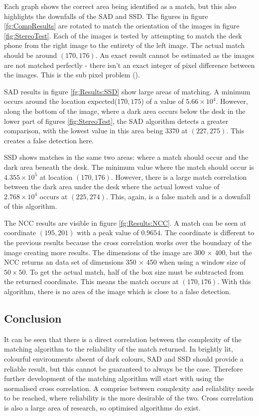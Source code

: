 Each graph shows the correct area being identified as a match, but this also highlights the downfalls of the SAD and SSD. The figures in figure \ref{fg:CompResults} are rotated to match the orientation of the images in figure \ref{fig:StereoTest}. Each of the images is tested by attempting to match the desk phone from the right image to the entirety of the left image. The actual match should be around $(170, 176)$. An exact result cannot be estimated as the images are not matched perfectly - there isn't an exact integer of pixel difference between the images. This is the sub pixel problem (\cite{haller2012design}).

SAD results in figure \ref{fg:Results:SSD} show large areas of matching. A minimum occurs around the location expected($170,175$) of a value of $5.66\times 10^4$. However, along the bottom of the image, where a dark area occurs below the desk in the lower part of figures \ref{fig:StereoTest}, the SAD algorithm detects a greater comparison, with the lowest value in this area being $3370$ at $(227, 275)$. This creates a false detection here. 

SSD shows matches in the same two areas: where a match should occur and the dark area beneath the desk. The minimum value where the match should occur is $4.355 \times 10^5$ at location $(170,176)$. However, there is a large match correlation between the dark area under the desk where the actual lowest value of $2.768\times10^4$ occurs at $(225,274)$. This, again, is a false match and is a downfall of this algorithm. 

The NCC results are visible in figure \ref{fg:Results:NCC}. A match can be seen at coordinate $(195,201)$ with a peak value of $0.9654$. The coordinate is different to the previous results because the cross correlation works over the boundary of the image creating more results. The dimensions of the image are 300 $\times$ 400, but the NCC returns an data set of dimensions 350 $\times$ 450 when using a window size of $50\times 50$. To get the actual match, half of the box size must be subtracted from the returned coordinate. This means the match occurs at $(170,176)$. With this algorithm, there is no area of the image which is close to a false detection. 

\subsection{Conclusion}
It can be seen that there is a direct correlation between the complexity of the matching algorithm to the reliability of the match returned. In brightly lit, colourful environments absent of dark colours, SAD and SSD should provide a reliable result, but this cannot be guaranteed to always be the case. Therefore further development of the matching algorithm will start with using the normalised cross correlation. A comprise between complexity and reliability needs to be reached, where reliability is the more desirable of the two. Cross correlation is also a large area of research, so optimised algorithms do exist.

